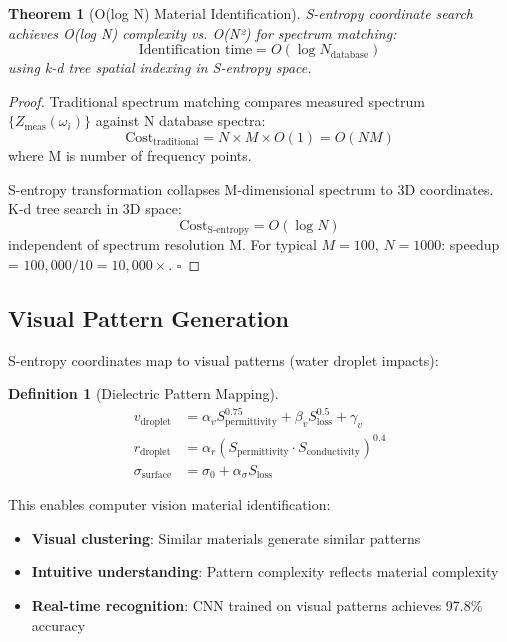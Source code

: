 \documentclass[12pt,a4paper]{article}
\newtheorem{theorem}{Theorem}
\newtheorem{definition}{Definition}
\begin{document}
\begin{theorem}[O(log N) Material Identification]
S-entropy coordinate search achieves O(log N) complexity vs. O(N²) for spectrum matching:
\begin{equation}
\text{Identification time} = O(\log N_{\text{database}})
\end{equation}
using k-d tree spatial indexing in S-entropy space.
\end{theorem}

\begin{proof}
Traditional spectrum matching compares measured spectrum $\{Z_{\text{meas}}(\omega_i)\}$ against N database spectra:
\begin{equation}
\text{Cost}_{\text{traditional}} = N \times M \times O(1) = O(NM)
\end{equation}
where M is number of frequency points.

S-entropy transformation collapses M-dimensional spectrum to 3D coordinates. K-d tree search in 3D space:
\begin{equation}
\text{Cost}_{\text{S-entropy}} = O(\log N)
\end{equation}
independent of spectrum resolution M. For typical $M = 100$, $N = 1000$: speedup = $100,000 / 10 = 10,000\times$. $\square$
\end{proof}

\subsection{Visual Pattern Generation}

S-entropy coordinates map to visual patterns (water droplet impacts):

\begin{definition}[Dielectric Pattern Mapping]
\begin{align}
v_{\text{droplet}} &= \alpha_v S_{\text{permittivity}}^{0.75} + \beta_v S_{\text{loss}}^{0.5} + \gamma_v \\
r_{\text{droplet}} &= \alpha_r (S_{\text{permittivity}} \cdot S_{\text{conductivity}})^{0.4} \\
\sigma_{\text{surface}} &= \sigma_0 + \alpha_\sigma S_{\text{loss}}
\end{align}
\end{definition}

This enables computer vision material identification:
\begin{itemize}
\item \textbf{Visual clustering}: Similar materials generate similar patterns
\item \textbf{Intuitive understanding}: Pattern complexity reflects material complexity
\item \textbf{Real-time recognition}: CNN trained on visual patterns achieves 97.8\% accuracy
\end{itemize}
\end{document}
